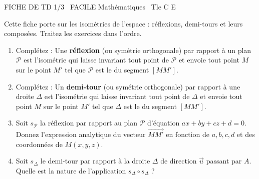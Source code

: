 \documentclass[11pt]{article}
\begin{document}
\begin{tcolorbox}[enhanced,colback=popink,colframe=popink,arc=10pt,boxrule=0pt,left=12pt,right=12pt,top=9pt,bottom=9pt]
{\color{white}\popxbold\small FICHE DE TD 1/3 \textbullet\ FACILE \hfill Mathématiques \textbullet\ Tle C E\par}
\end{tcolorbox}
\vspace{4pt}
Cette fiche porte sur les isométries de l'espace : réflexions, demi-tours et leurs composées. Traitez les exercices dans l'ordre.

\begin{exercice}
\begin{enumerate}
    \item Complétez : Une \textbf{réflexion} (ou symétrie orthogonale) par rapport à un plan $\mathcal{P}$ est l'isométrie qui laisse invariant tout point de $\mathcal{P}$ et envoie tout point $M$ sur le point $M'$ tel que $\mathcal{P}$ est le \underline{\hspace{3cm}} du segment $[MM']$.
    \item Complétez : Un \textbf{demi-tour} (ou symétrie orthogonale) par rapport à une droite $\Delta$ est l'isométrie qui laisse invariant tout point de $\Delta$ et envoie tout point $M$ sur le point $M'$ tel que $\Delta$ est le \underline{\hspace{3cm}} du segment $[MM']$.
    \item Soit $s_{\mathcal{P}}$ la réflexion par rapport au plan $\mathcal{P}$ d'équation $ax+by+cz+d=0$. Donnez l'expression analytique du vecteur $\overrightarrow{MM'}$ en fonction de $a,b,c,d$ et des coordonnées de $M(x,y,z)$.
    \item Soit $s_{\Delta}$ le demi-tour par rapport à la droite $\Delta$ de direction $\vec{u}$ passant par $A$. Quelle est la nature de l'application $s_{\Delta} \circ s_{\Delta}$ ?
\end{enumerate}
\end{exercice}
\end{document}
